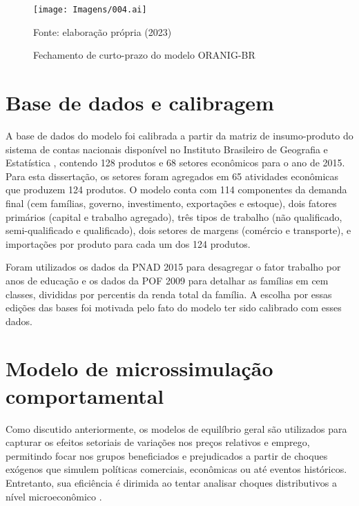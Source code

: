 \begin{landscape}
	\begin{figure}
		\centering
		\texttt{[image: Imagens/004.ai]}
		\caption{Fechamento de curto-prazo do modelo ORANIG-BR}
		\label{fig:fechamento}
		\footnotesize
		Fonte: elaboração própria (2023)
	\end{figure}
\end{landscape}


\section{Base de dados e calibragem} \label{sec:dados}

A base de dados do modelo foi calibrada a partir da matriz de insumo-produto do sistema de contas nacionais disponível no Instituto Brasileiro de Geografia e Estatística \cite{scn}, contendo 128 produtos e 68 setores econômicos para o ano de 2015. Para esta dissertação, os setores foram agregados em 65 atividades econômicas que produzem 124 produtos. O modelo conta com 114 componentes da demanda final (cem famílias, governo, investimento, exportações e estoque), dois fatores primários (capital e trabalho agregado), três tipos de trabalho (não qualificado, semi-qualificado e qualificado), dois setores de margens (comércio e transporte), e importações por produto para cada um dos 124 produtos.

Foram utilizados os dados da PNAD 2015 \cite{pnad} para desagregar o fator trabalho por anos de educação e os dados da POF 2009 \cite{pof} para detalhar as famílias em cem classes, divididas por percentis da renda total da família. A escolha por essas edições das bases foi motivada pelo fato do modelo ter sido calibrado com esses dados.


\section{Modelo de microssimulação comportamental} \label{sec:microssimulacao}

Como discutido anteriormente, os modelos de equilíbrio geral são utilizados para capturar os efeitos setoriais de variações nos preços relativos e emprego, permitindo focar nos grupos beneficiados e prejudicados a partir de choques exógenos que simulem políticas comerciais, econômicas ou até eventos históricos. Entretanto, sua eficiência é dirimida ao tentar analisar choques distributivos a nível microeconômico \cite{tiberti17}.

